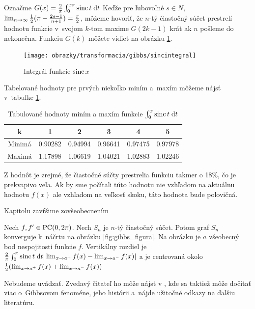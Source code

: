 Označme $G(x) = \frac{2}{\pi} \int_0^{x \pi} \operatorname{sinc} t \; \mathrm{d} t$ 
Keďže pre ľubovoľné $s\in N$, $\lim_{n \rightarrow \infty} \frac{1}{2} (\pi -
\frac{2s-1}{n+1} )=\frac{\pi}{2}$, môžeme hovoriť, že
$n$-tý čiastočný súčet prestrelí hodnotu funkcie
v~svojom $k$-tom maxime $G(2k-1)$ krát ak
$n$ pošleme do nekonečna.
Funkciu $G(k)$ môžete vidieť na obrázku \ref{fig:gibbs_sincint}.

\begin{figure}[htp]
    \centering
    \texttt{[image: obrazky/transformacia/gibbs/sincintegral]}
    \caption{Integrál funkcie $\operatorname{sinc} x$}
    \label{fig:gibbs_sincint}
\end{figure}


Tabelované hodnoty pre prvých niekoľko miním a~maxím môžeme nájsť 
v~tabuľke \ref{tab:gibbs_table}. 

\begin{table}[htb]
    \centering
    \begin{tabular}{c|c|c|c|c|c|}
        k&1&2&3&4&5 \\ \hline
        Minimá &0.90282&0.94994&0.96641&0.97475&0.97978 \\
        Maximá &1.17898&1.06619&1.04021&1.02883&1.02246
    \end{tabular}
    \caption{Tabulované hodnoty miním a maxím funkcie $\int_0^x \operatorname{sinc} t \; \mathrm{d} t$}
    \label{tab:gibbs_table}
\end{table}

Z hodnôt je zrejmé, že čiastočné súčty prestrelia funkciu takmer o
18\%, čo je prekvapivo veľa. Ak by sme počítali túto hodnotu nie
vzhľadom na aktuálnu hodnotu $f(x)$ ale vzhľadom na veľkosť skoku,
táto hodnota bude polovičná. 

Kapitolu zavŕšime zovšeobecnením
\begin{veta}
    Nech $f,f'\in\mbox{PC}(0,2\pi)$. Nech $S_n$ je $n$-tý čiastočný súčet.
    Potom graf $S_n$ konverguje k~náčrtu na obrázku
    \ref{fig:gibbs_figura}.
    Na obrázku je $a$ všeobecný bod nespojitosti funkcie $f$.
    Vertikálny rozdiel je $\frac{2}{\pi} \int_0^{\pi} \operatorname{sinc} t \; \mathrm{d} t
    |\lim_{x\rightarrow a^+} f(x) - \lim_{x\rightarrow a^-} f(x)|$ a je
    centrovaná okolo 
    $\frac{1}{2}(\lim_{x\rightarrow a^+} f(x) + \lim_{x\rightarrow a^-} f(x))$
\end{veta}
\begin{dokaz}
    Nebudeme uvádzať. Zvedavý čitateľ ho môže nájsť v \cite{hewitt},
    kde sa taktiež môže dočítať viac o~Gibbsovom fenoméne, jeho
    histórii a~nájde užitočné odkazy na ďalšiu literatúru.
\end{dokaz}

